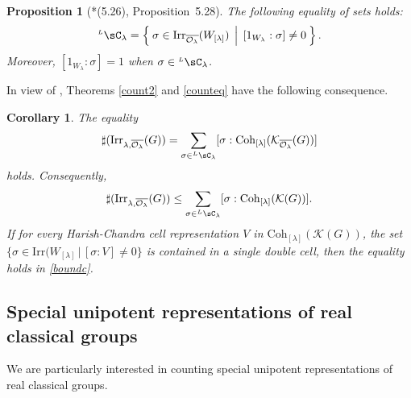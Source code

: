 \documentclass[12pt,a4paper]{amsart}
\newcommand{\CK}{{\mathcal {K}}}
\newcommand{\CO}{{\mathcal {O}}}
\newcommand{\sgn}{\operatorname{sgn}}
\numberwithin{equation}{section}
\newtheorem{prop}[thm]{Proposition}
\newtheorem{cor}[thm]{Corollary}
\theoremstyle{remark}
\def\Irr{\mathrm{Irr}}
\def\LC{{}^{\scriptscriptstyle L}\sC}
\def\Coh{\mathrm{Coh}}
\newcommand{\Lam}{{[\lambda]}}
\begin{document}



 \begin{prop}[{\cite{BVUni}*{(5.26), Proposition~5.28}}]\label{lem:lcell.BV0}
  The following equality of sets holds: 
   \[
     \LC_{\lambda} = \Set{\sigma\in \Irr_{\overline{\CO_\lambda}}(W_\Lam)\, |\,   [1_{W_{\lambda}}:\sigma]\neq 0}.
   \]
   Moreover, $[1_{W_{\lambda}}:\sigma]=1$ when
   $\sigma\in \LC_\lambda$.
 \end{prop}


In view of , Theorems \ref{count2} and \ref{counteq} have the following consequence.

 \begin{cor}
   \label{cor:bound} The equality
   \[
     \sharp(\Irr_{\lambda,\overline{\CO_\lambda}}(G)) =\sum_{\sigma\in \LC_\lambda} [\sigma: \Coh_{\Lam}(\CK_{\overline{\CO_\lambda}}(G))] 
   \]
   holds. 
   Consequently,
   \begin{equation}\label{boundc}
     \sharp(\Irr_{\lambda,\overline{\CO_\lambda}}(G)) \leq \sum_{\sigma\in \LC_\lambda} [\sigma: \Coh_{\Lam}(\CK(G))].
   \end{equation}
   If for every Harish-Chandra cell representation $V$  in $\Coh_{\Lam}(\CK(G))$, the set $\{\sigma\in \Irr(W_{[\lambda]}\,|\, [\sigma: V]\neq 0\}$ is contained in a single double cell, then the equality holds in
   \eqref{boundc}.

 \end{cor}


 \subsection{Special unipotent representations of real classical groups}
 \label{sec:defunip}

 We are particularly interested in counting special unipotent representations of
 real classical groups.
\end{document}

